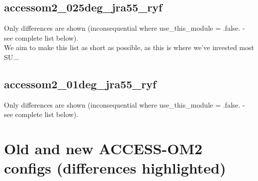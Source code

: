 \documentclass[10pt]{article}
\newcommand{\nmldiffer}[1]{#1} %
\newcommand{\doscript}[1]{{\footnotesize\textsf{}}}
\begin{document}
\subsection{accessom2_025deg_jra55_ryf}
Only differences are shown (inconsequential where use_this_module = .false. - see complete list below).\\
We aim to make this list as short as possible, as this is where we've invested most SU...
\doscript{/Users/andy/anaconda/bin/python3 /Users/andy/bin/nmltab.py -d --format latex original/kiss_accessom2_025deg_jra55_ryf_input.nml new_accessom2_025deg_jra55_ryf_input.nml}
\subsection{accessom2_01deg_jra55_ryf}
Only differences are shown (inconsequential where use_this_module = .false. - see complete list below).
\doscript{/Users/andy/anaconda/bin/python3 /Users/andy/bin/nmltab.py -d --format latex original/hogg_accessom2_01deg_jra55_ryf_input.nml new_accessom2_01deg_jra55_ryf_input.nml}

\newpage
\section{Old and new ACCESS-OM2 configs (differences highlighted)}
\renewcommand{\nmldiffer}[1]{\colorbox{hilite}{#1}}\setlength{\fboxsep}{0pt} %
\doscript{/Users/andy/anaconda/bin/python3 /Users/andy/bin/nmltab.py --format latex original/hogg_accessom2_1deg_jra55_ryf_input.nml new_accessom2_1deg_jra55_ryf_input.nml original/kiss_accessom2_025deg_jra55_ryf_input.nml new_accessom2_025deg_jra55_ryf_input.nml original/hogg_accessom2_01deg_jra55_ryf_input.nml new_accessom2_01deg_jra55_ryf_input.nml}

\end{document}
